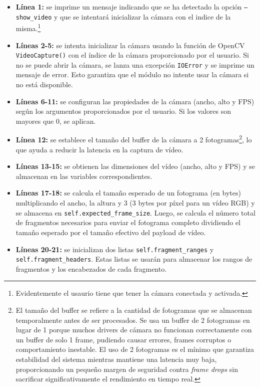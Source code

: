 \begin{itemize}
    \item \textbf{Línea 1:} se imprime un mensaje indicando que se ha detectado la opción \texttt{--show\_video} y que se intentará inicializar la cámara con el indice de la misma.\footnote{Evidentemente el usaurio tiene que tener la cámara conectada y activada.}
    \item \textbf{Líneas 2-5:} se intenta inicializar la cámara usando la función de OpenCV \texttt{VideoCapture()} con el índice de la cámara proporcionado por el usuario. Si no se puede abrir la cámara, se lanza una excepción \texttt{IOError} y se imprime un mensaje de error. Esto garantiza que el módulo no intente usar la cámara si no está disponible.
    \item \textbf{Líneas 6-11:} se configuran las propiedades de la cámara (ancho, alto y FPS) según los argumentos proporcionados por el usuario. Si los valores son mayores que 0, se aplican.
    \item \textbf{Línea 12:} se establece el tamaño del buffer de la cámara a 2 fotogramas\footnote{El tamaño del buffer se refiere a la cantidad de fotogramas que se almacenan temporalmente antes de ser procesados. Se usa un buffer de 2 fotogramas en lugar de 1 porque muchos drivers de cámara no funcionan correctamente con un buffer de solo 1 frame, pudiendo causar errores, frames corruptos o comportamiento inestable. El uso de 2 fotogramas es el mínimo que garantiza estabilidad del sistema mientras mantiene una latencia muy baja, proporcionando un pequeño margen de seguridad contra \textit{frame drops} sin sacrificar significativamente el rendimiento en tiempo real.}, lo que ayuda a reducir la latencia en la captura de vídeo.
    \item \textbf{Líneas 13-15:} se obtienen las dimensiones del vídeo (ancho, alto y FPS) y se almacenan en las variables correspondientes.
    \item \textbf{Líneas 17-18:} se calcula el tamaño esperado de un fotograma (en bytes) multiplicando el ancho, la altura y 3 (3 bytes por píxel para un vídeo RGB) y se almacena en \texttt{self.expected\_frame\_size}. Luego, se calcula el número total de fragmentos necesarios para enviar el fotograma completo dividiendo el tamaño esperado por el tamaño efectivo del payload de vídeo.
    \item \textbf{Líneas 20-21:} se inicializan dos listas \texttt{self.fragment\_ranges} y \texttt{self.fragment\_headers}. Estas listas se usarán para almacenar los rangos de fragmentos y los encabezados de cada fragmento.

\end{itemize}
